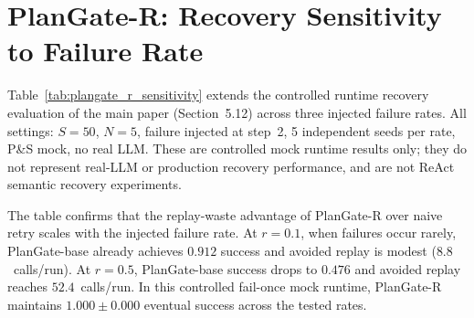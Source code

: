 \documentclass[sigconf,anonymous]{acmart}
\begin{document}
\section{PlanGate-R: Recovery Sensitivity to Failure Rate}
\label{sec:recovery-appendix}

Table~\ref{tab:plangate_r_sensitivity} extends the controlled runtime recovery evaluation of the main paper (Section~5.12) across three injected failure rates.
All settings: $S{=}50$, $N{=}5$, failure injected at step~2, 5 independent seeds per rate, P\&S mock, no real LLM.
These are controlled mock runtime results only; they do not represent real-LLM or production recovery performance, and are not ReAct semantic recovery experiments.

The table confirms that the replay-waste advantage of PlanGate-R over naive retry scales with the injected failure rate.
At $r{=}0.1$, when failures occur rarely, PlanGate-base already achieves $0.912$ success and avoided replay is modest ($8.8$~calls/run).
At $r{=}0.5$, PlanGate-base success drops to $0.476$ and avoided replay reaches $52.4$~calls/run.
In this controlled fail-once mock runtime, PlanGate-R maintains $1.000\pm0.000$ eventual success across the tested rates.
\end{document}
